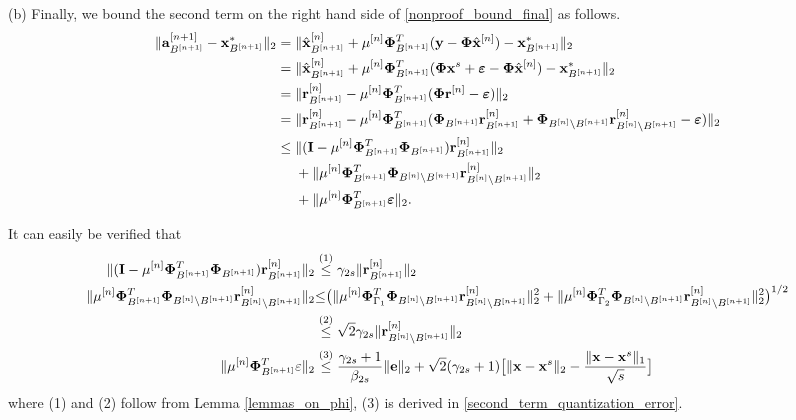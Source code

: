 \documentclass{article}
\begin{document}
(b) Finally, we bound the second term on the right hand side of \ref{nonproof_bound_final} as follows.
\begin{equation}\label{last_term_main_theorem}
    \begin{split}
       \|{{\bf a}}_{B^{[n+1]}}^{[n+1]} - {{\bf x}}_{B^{[n+1]}}^{*} \|_2 &= \|{\hat{\bf x}}_{B^{[n+1]}}^{[n]} + \mu^{[n]}{\bf \Phi}_{B^{[n+1]}}^T({\bf y}-{\bf \Phi} \hat{{\bf x}}^{[n]}) - {{\bf x}}_{B^{[n+1]}}^{*} \|_2\\
        &= \|{\hat{\bf x}}_{B^{[n+1]}}^{[n]} + \mu^{[n]}{\bf \Phi}_{B^{[n+1]}}^T({\bf \Phi} {\bf x}^s + \boldsymbol{\varepsilon}-{\bf \Phi} \hat{\bf x}^{[n]}) - {{\bf x}}_{B^{[n+1]}}^{*} \|_2\\
         &= \|{{\bf r}}_{B^{[n+1]}}^{[n]} - \mu^{[n]}{\bf \Phi}_{B^{[n+1]}}^T({\bf \Phi} {\bf r}^{[n]}  -\boldsymbol{\varepsilon}) \|_2\\
         &= \|{{\bf r}}_{B^{[n+1]}}^{[n]} - \mu^{[n]}{\bf \Phi}_{B^{[n+1]}}^T({\bf \Phi}_{B^{[n+1]}}{\bf r}^{[n]}_{B^{[n+1]}} + {\bf \Phi}_{B^{[n]}\backslash B^{[n+1]}}{\bf r}^{[n]}_{B^{[n]}\backslash B^{[n+1]}}  - \boldsymbol{\varepsilon}) \|_2\\
         &\leq \|({\boldsymbol{\rm I}} - \mu^{[n]}{\bf \Phi}_{B^{[n+1]}}^T{\bf \Phi}_{B^{[n+1]}}){\bf r}^{[n]}_{B^{[n+1]}}\|_2\\
         &\ \ \ \ + \|\mu^{[n]}{\bf \Phi}_{B^{[n+1]}}^T{\bf \Phi}_{B^{[n]}\backslash B^{[n+1]}}{\bf r}^{[n]}_{B^{[n]}\backslash B^{[n+1]}}\|_2\\
         &\ \ \ \ + \|\mu^{[n]}{\bf \Phi}_{B^{[n+1]}}^T\boldsymbol{\varepsilon}\|_2.
    \end{split}
\end{equation}

It can easily be verified that
\begin{equation}\label{last_term_main_theorem2}
    \begin{split}
        \|({\boldsymbol{\rm I}} - \mu^{[n]}{\bf \Phi}_{B^{[n+1]}}^T{\bf \Phi}_{B^{[n+1]}}){\bf r}^{[n]}_{B^{[n+1]}}\|_2 &\overset{(1)}{\leq} \gamma_{2s}\| {\bf r}_{B^{[n+1]}}^{[n]}\|_2\\
        \|\mu^{[n]}{\bf \Phi}_{B^{[n+1]}}^T{\bf \Phi}_{B^{[n]}\backslash B^{[n+1]}}{\bf r}^{[n]}_{B^{[n]}\backslash B^{[n+1]}}\|_2 &{\leq} \big ({        \|\mu^{[n]}{\bf \Phi}_{\Gamma_1}^T{\bf \Phi}_{B^{[n]}\backslash B^{[n+1]}}{\bf r}^{[n]}_{B^{[n]}\backslash B^{[n+1]}}\|_2^2 +         \|\mu^{[n]}{\bf \Phi}_{\Gamma_2}^T{\bf \Phi}_{B^{[n]}\backslash B^{[n+1]}}{\bf r}^{[n]}_{B^{[n]}\backslash B^{[n+1]}}\|_2^2}\big )^{1/2}\\
        &\overset{(2)}{\leq}\sqrt{2}\gamma_{2s}\| {\bf r}^{[n]}_{B^{[n]}\backslash B^{[n+1]}}\|_2\\
        \|\mu^{[n]}{\bf \Phi}_{B^{[n+1]}}^T\varepsilon\|_2 &\overset{(3)}{\leq} \frac{\gamma_{2s}+1}{\beta_{2s}}\| {\bf e}\|_2 + \sqrt{2}(\gamma_{2s}+1) \big [ \|{\bf x} - {\bf x}^s\|_2 - \frac{\|{\bf x} - {\bf x}^s\|_1}{\sqrt{s}}\big]
    \end{split}
\end{equation}
where (1) and (2) follow from Lemma \ref{lemmas_on_phi}, (3) is derived in \ref{second_term_quantization_error}.
\end{document}
